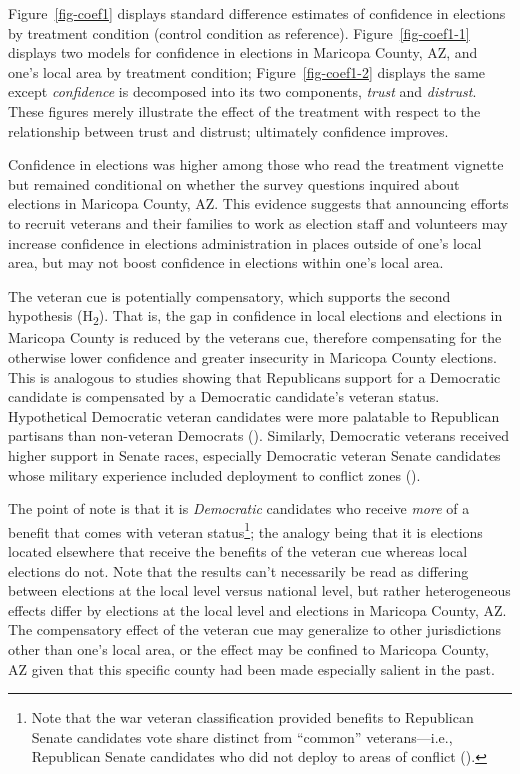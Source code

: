 \documentclass[
  12pt,
  letterpaper,
]{article}
\begin{document}
Figure~\ref{fig-coef1} displays standard difference estimates of
confidence in elections by treatment condition (control condition as
reference). Figure~\ref{fig-coef1-1} displays two models for confidence
in elections in Maricopa County, AZ, and one's local area by treatment
condition; Figure~\ref{fig-coef1-2} displays the same except
\emph{confidence} is decomposed into its two components, \emph{trust}
and \emph{distrust}. These figures merely illustrate the effect of the
treatment with respect to the relationship between trust and distrust;
ultimately confidence improves.

Confidence in elections was higher among those who read the treatment
vignette but remained conditional on whether the survey questions
inquired about elections in Maricopa County, AZ. This evidence suggests
that announcing efforts to recruit veterans and their families to work
as election staff and volunteers may increase confidence in elections
administration in places outside of one's local area, but may not boost
confidence in elections within one's local area.

The veteran cue is potentially compensatory, which supports the second
hypothesis (H\textsubscript{2}). That is, the gap in confidence in local
elections and elections in Maricopa County is reduced by the veterans
cue, therefore compensating for the otherwise lower confidence and
greater insecurity in Maricopa County elections. This is analogous to
studies showing that Republicans support for a Democratic candidate is
compensated by a Democratic candidate's veteran status. Hypothetical
Democratic veteran candidates were more palatable to Republican
partisans than non-veteran Democrats
().
Similarly, Democratic veterans received higher support in Senate races,
especially Democratic veteran Senate candidates whose military
experience included deployment to conflict zones
().

The point of note is that it is \emph{Democratic} candidates who receive
\emph{more} of a benefit that comes with veteran status\footnote{Note
  that the war veteran classification provided benefits to Republican
  Senate candidates vote share distinct from ``common'' veterans---i.e.,
  Republican Senate candidates who did not deploy to areas of conflict
  ().}; the analogy being
that it is elections located elsewhere that receive the benefits of the
veteran cue whereas local elections do not. Note that the results can't
necessarily be read as differing between elections at the local level
versus national level, but rather heterogeneous effects differ by
elections at the local level and elections in Maricopa County, AZ. The
compensatory effect of the veteran cue may generalize to other
jurisdictions other than one's local area, or the effect may be confined
to Maricopa County, AZ given that this specific county had been made
especially salient in the past.
\end{document}
